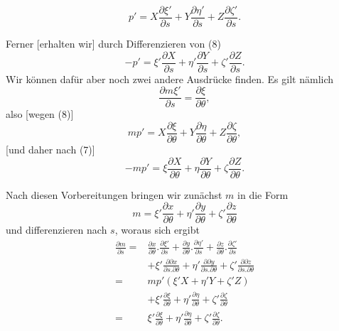 %
\[
p'=X\frac{\partial\xi'}{\partial s}+Y\frac{\partial\eta'}{\partial s}+Z\frac{\partial\zeta'}{\partial s}.
\]

Ferner [erhalten wir] durch Differenzieren von (8)
\[
-p'=\xi'\frac{\partial X}{\partial s}+\eta'\frac{\partial Y}{\partial s}+\zeta'\frac{\partial Z}{\partial s}.
\]
Wir können dafür aber noch zwei andere Ausdrücke finden. Es gilt nämlich
\[
\frac{\partial m\xi'}{\partial s}=\frac{\partial\xi}{\partial\theta},
\]
also [wegen (8)]
\[
mp'=X\frac{\partial\xi}{\partial\theta}+Y\frac{\partial\eta}{\partial\theta}+Z\frac{\partial\zeta}{\partial\theta},
\]
[und daher nach (7)]
\[
-mp'=\xi\frac{\partial X}{\partial\theta}+\eta\frac{\partial Y}{\partial\theta}+\zeta\frac{\partial Z}{\partial\theta}.
\]

Nach diesen Vorbereitungen bringen wir zunächst $m$ in die Form
\[
m=\xi'\frac{\partial x}{\partial\theta}+\eta'\frac{\partial y}{\partial\theta}+\zeta'\frac{\partial z}{\partial\theta}
\]
und differenzieren nach $s$, woraus sich ergibt
\[
\begin{aligned}
\frac{\partial m}{\partial s}={}&\frac{\partial x}{\partial\theta}.\frac{\partial\xi'}{\partial s}+\frac{\partial y}{\partial\theta}.\frac{\partial\eta'}{\partial s}+\frac{\partial z}{\partial\theta}.\frac{\partial\zeta'}{\partial s}\\
&+\xi'\frac{\partial\partial x}{\partial s.\partial\theta}+\eta'\frac{\partial\partial y}{\partial s.\partial\theta}+\zeta'\frac{\partial\partial z}{\partial s.\partial\theta}\\
={}&mp'(\xi'X+\eta'Y+\zeta'Z)\\
&+\xi'\frac{\partial\xi}{\partial\theta}+\eta'\frac{\partial\eta}{\partial\theta}+\zeta'\frac{\partial\zeta}{\partial\theta}\\
={}&\xi'\frac{\partial\xi}{\partial\theta}+\eta'\frac{\partial\eta}{\partial\theta}+\zeta'\frac{\partial\zeta}{\partial\theta}.
\end{aligned}
\]
